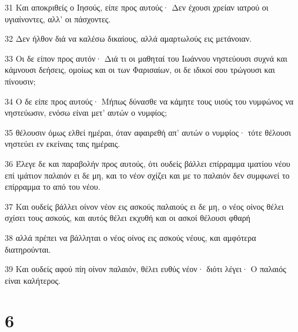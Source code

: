 \par 31 Και αποκριθείς ο Ιησούς, είπε προς αυτούς· Δεν έχουσι χρείαν ιατρού οι υγιαίνοντες, αλλ' οι πάσχοντες.
\par 32 Δεν ήλθον διά να καλέσω δικαίους, αλλά αμαρτωλούς εις μετάνοιαν.
\par 33 Οι δε είπον προς αυτόν· Διά τι οι μαθηταί του Ιωάννου νηστεύουσι συχνά και κάμνουσι δεήσεις, ομοίως και οι των Φαρισαίων, οι δε ιδικοί σου τρώγουσι και πίνουσιν;
\par 34 Ο δε είπε προς αυτούς· Μήπως δύνασθε να κάμητε τους υιούς του νυμφώνος να νηστεύωσιν, ενόσω είναι μετ' αυτών ο νυμφίος;
\par 35 θέλουσιν όμως ελθεί ημέραι, όταν αφαιρεθή απ' αυτών ο νυμφίος· τότε θέλουσι νηστεύει εν εκείναις ταις ημέραις.
\par 36 Έλεγε δε και παραβολήν προς αυτούς, ότι ουδείς βάλλει επίρραμμα ιματίου νέου επί ιμάτιον παλαιόν ει δε μη, και το νέον σχίζει και με το παλαιόν δεν συμφωνεί το επίρραμμα το από του νέου.
\par 37 Και ουδείς βάλλει οίνον νέον εις ασκούς παλαιούς ει δε μη, ο νέος οίνος θέλει σχίσει τους ασκούς, και αυτός θέλει εκχυθή και οι ασκοί θέλουσι φθαρή
\par 38 αλλά πρέπει να βάλληται ο νέος οίνος εις ασκούς νέους, και αμφότερα διατηρούνται.
\par 39 Και ουδείς αφού πίη οίνον παλαιόν, θέλει ευθύς νέον· διότι λέγει· Ο παλαιός είναι καλήτερος.

\chapter{6}

